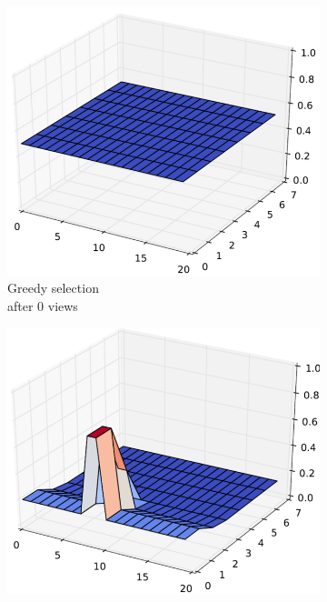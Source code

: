 \documentclass[letterpaper, 10 pt, conference]{ieeeconf}  %
\begin{document}
\begin{figure}
    \centering
    \begin{subfigure}[b]{.24\textwidth}
        \centering
        \includegraphics[width=.99\textwidth]{greedy1.png}
        \caption{Greedy selection \\ after 0 views}
        \vspace*{2mm}
        \label{fig:greedy0view}
    \end{subfigure}
    \hfill
    \begin{subfigure}[b]{.24\textwidth}
        \centering
        {\includegraphics[width=.99\textwidth]{greedy2.png}}

\end{subfigure}
\end{figure}
\end{document}
